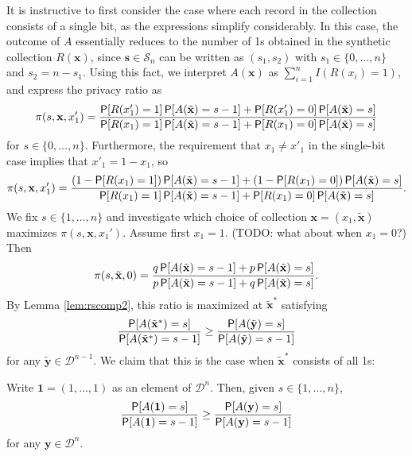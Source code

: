 \documentclass[11pt,draft]{article}
\newcommand{\Dsp}{\mathcal{D}}
\newcommand{\Ssp}{\mathcal{S}}
\newcommand{\xv}{\mathbf{x}}
\newcommand{\yv}{\mathbf{y}}
\newcommand{\sv}{\mathbf{s}}
\newcommand{\xvt}{\tilde{\xv}}
\newcommand{\yvt}{\tilde{\yv}}
\newcommand{\one}{\boldsymbol{1}}
\begin{document}
It is instructive to first consider the case where each record in the collection consists of a single bit, as the expressions simplify considerably.
In this case, the outcome of $A$ essentially reduces to the number of 1s obtained in the synthetic collection $R(\xv)$, since $\sv\in\Ssp_n$ can be written as $(s_1,s_2)$ with $s_1\in\{0,\dots,n\}$ and $s_2 = n-s_1$. 
Using this fact, we interpret $A(\xv)$ as $\sum_{i=1}^n I(R(x_i) = 1)$,
and express the privacy ratio as
\[ \pi(s,\xv,x_1') = \frac{\P[R(x'_1) = 1] \P[A(\xvt) = s-1] +
\P[R(x'_1) = 0] \P[A(\xvt) = s]}
{\P[R(x_1) = 1] \P[A(\xvt) = s-1] + \P[R(x_1) = 0] \P[A(\xvt) = s]}
\]
for $s \in \{0,\dots,n\}$. Furthermore, the requirement that $x_1 \neq x'_1$ in the single-bit case implies that $x'_1 = 1-x_1$, so
\[ \pi(s,\xv,x_1') = \frac{(1-\P[R(x_1) = 1]) \P[A(\xvt) = s-1] +
(1-\P[R(x_1) = 0]) \P[A(\xvt) = s]}
{\P[R(x_1) = 1] \P[A(\xvt) = s-1] + \P[R(x_1) = 0] \P[A(\xvt) = s]}.
\]
We fix $s \in \{1,\dots,n\}$ and investigate which choice of collection $\xv = (x_1,\xvt)$ maximizes $\pi(s,\xv,x_1')$.
Assume first $x_1 = 1$. (TODO: what about when $x_1 = 0$?) Then
\[ \pi(s,\xvt,0) = \frac{q \P[A(\xvt) = s-1] + p \P[A(\xvt) = s]}
{p \P[A(\xvt) = s-1] + q \P[A(\xvt) = s]}.
\]
By Lemma \ref{lem:rscomp2}, this ratio is maximized at $\xvt^*$ satisfying 
\[ \frac{\P[A(\xvt^*) = s]}{\P[A(\xvt^*) = s-1]} \geq
\frac{\P[A(\yvt) = s]}{\P[A(\yvt) = s-1]} \]
for any $\yvt \in \Dsp^{n-1}$.
We claim that this is the case when $\xvt^*$ consists of all 1s:
\begin{claim}
Write $\one = (1,...,1)$ as an element of $\Dsp^n$.
Then, given $s \in \{1,\dots,n\}$,
\begin{equation} \label{eq:maxpA}
\frac{\P[A(\one) = s]}{\P[A(\one) = s-1]} \geq
\frac{\P[A(\yv) = s]}{\P[A(\yv) = s-1]}
\end{equation}
for any $\yv \in \Dsp^n$.
\end{claim}
\end{document}
